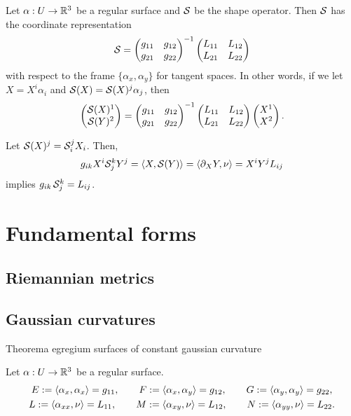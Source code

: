 \documentclass{../../large}
\begin{document}
\begin{thm}
Let $\alpha:U\to\mathbb{R}^3$ be a regular surface and $\mathcal{S}$ be the shape operator.
Then $\mathcal{S}$ has the coordinate representation
\[\mathcal{S}=\begin{pmatrix}g_{11}&g_{12}\\g_{21}&g_{22}\end{pmatrix}^{-1}\begin{pmatrix}L_{11}&L_{12}\\L_{21}&L_{22}\end{pmatrix}\]
with respect to the frame $\{\alpha_x,\alpha_y\}$ for tangent spaces.
In other words, if we let $X=X^i\alpha_i$ and $\mathcal{S}(X)=\mathcal{S}(X)^j\alpha_j$, then
\[\begin{pmatrix}\mathcal{S}(X)^1\\\mathcal{S}(Y)^2\end{pmatrix}=\begin{pmatrix}g_{11}&g_{12}\\g_{21}&g_{22}\end{pmatrix}^{-1}\begin{pmatrix}L_{11}&L_{12}\\L_{21}&L_{22}\end{pmatrix}\begin{pmatrix}X^1\\X^2\end{pmatrix}.\]
\end{thm}
\begin{pf}
Let $\mathcal{S}(X)^j=\mathcal{S}_i^jX_i$.
Then,
\[g_{ik}X^i\cS_j^kY^j=\<X,\cS(Y)\>=\<\pd_XY,\nu\>=X^iY^jL_{ij}\]
implies $g_{ik}\,\mathcal{S}_j^k=L_{ij}$.
\end{pf}

























\chapter{Fundamental forms}

\section{Riemannian metrics}

\section{Gaussian curvatures}
Theorema egregium
surfaces of constant gaussian curvature


\begin{defn}
Let $\alpha:U\to\mathbb{R}^3$ be a regular surface.
\begin{gather*}
E:=\langle\alpha_x,\alpha_x\rangle=g_{11},\qquad F:=\langle\alpha_x,\alpha_y\rangle=g_{12},\qquad G:=\langle\alpha_y,\alpha_y\rangle=g_{22},\\
L:=\langle\alpha_{xx},\nu\rangle=L_{11},\qquad M:=\langle\alpha_{xy},\nu\rangle=L_{12},\qquad N:=\langle\alpha_{yy},\nu\rangle=L_{22}.
\end{gather*}
\end{defn}
\end{document}
